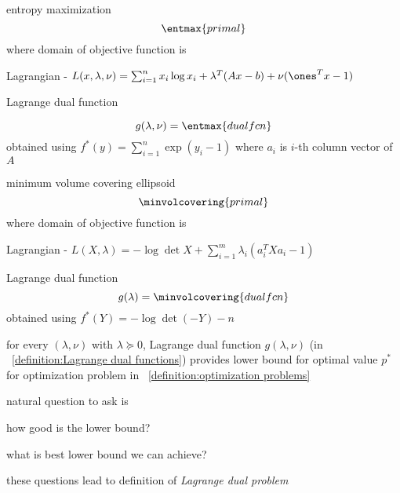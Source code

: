 \documentclass[17pt,landscape]{foils}
\begin{document}
{\item
	entropy maximization
	$$
		\entmax{primal}
	$$
	where domain of objective function is \
	\bit
	\item
		Lagrangian - $L(x,\lambda,\nu) = \sum_{i=1}^n x_i\log x_i + \lambda^T(Ax-b) + \nu(\ones^Tx-1)$
	\item
		Lagrange dual function%

		$$
			g(\lambda,\nu) = \entmax{dual fcn}
		$$
		obtained using $f^\ast(y) = \sum_{i=1}^n \exp(y_i-1)$
		where $a_i$ is $i$-th column vector of $A$
	\eit

\item
	minimum volume covering ellipsoid
	$$
		\minvolcovering{primal}
	$$
	where domain of objective function is \
	\bit
	\item
		Lagrangian - $L(X,\lambda) = -\log \det X + \sum_{i=1}^m \lambda_i(a_i^T X a_i - 1)$
	\item
		Lagrange dual function%
		$$
			g(\lambda)
				= \minvolcovering{dual fcn}
		$$
		obtained using $f^\ast(Y) = -\log\det(-Y) - n$
	\eit
\eit



\bit
\item
	for every $(\lambda,\nu)$ with $\lambda\succeq 0$,
	Lagrange dual function $g(\lambda,\nu)$ (in ~\ref{definition:Lagrange dual functions})
	provides lower bound for optimal value $p^\ast$
	for optimization problem in \definitionname~\ref{definition:optimization problems}\

\vitem
	natural question to ask is
	\bit
	\item
		how good is the lower bound?
	\item
		what is best lower bound we can achieve?
	\eit

\vitem
	these questions lead to definition of \emph{Lagrange dual problem}\
\eit
\vfill



}
\end{document}
